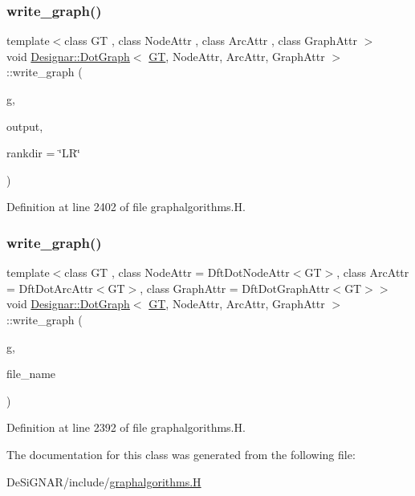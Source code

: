 \subsubsection{\texorpdfstring{write\+\_\+graph()}{write\_graph()}\hspace{0.1cm}{\footnotesize\ttfamily [1/2]}}
{\footnotesize\ttfamily template$<$class GT , class Node\+Attr , class Arc\+Attr , class Graph\+Attr $>$ \\
void \hyperlink{class_designar_1_1_dot_graph}{Designar\+::\+Dot\+Graph}$<$ \hyperlink{demo-buildgraph_8_c_a3001c40d2c31ca87ed96cd7d1334a55e}{GT}, Node\+Attr, Arc\+Attr, Graph\+Attr $>$\+::write\+\_\+graph (\begin{DoxyParamCaption}\item[{const \hyperlink{demo-buildgraph_8_c_a3001c40d2c31ca87ed96cd7d1334a55e}{GT} \&}]{g,  }\item[{std\+::ofstream \&}]{output,  }\item[{const std\+::string \&}]{rankdir = {\ttfamily \char`\"{}LR\char`\"{}} }\end{DoxyParamCaption})}



Definition at line 2402 of file graphalgorithms.\+H.

\mbox{\label{class_designar_1_1_dot_graph_a6f2b98b76d2c970ad875a59388f693cb}} 
\subsubsection{\texorpdfstring{write\+\_\+graph()}{write\_graph()}\hspace{0.1cm}{\footnotesize\ttfamily [2/2]}}
{\footnotesize\ttfamily template$<$class GT , class Node\+Attr  = Dft\+Dot\+Node\+Attr$<$\+G\+T$>$, class Arc\+Attr  = Dft\+Dot\+Arc\+Attr$<$\+G\+T$>$, class Graph\+Attr  = Dft\+Dot\+Graph\+Attr$<$\+G\+T$>$$>$ \\
void \hyperlink{class_designar_1_1_dot_graph}{Designar\+::\+Dot\+Graph}$<$ \hyperlink{demo-buildgraph_8_c_a3001c40d2c31ca87ed96cd7d1334a55e}{GT}, Node\+Attr, Arc\+Attr, Graph\+Attr $>$\+::write\+\_\+graph (\begin{DoxyParamCaption}\item[{const \hyperlink{demo-buildgraph_8_c_a3001c40d2c31ca87ed96cd7d1334a55e}{GT} \&}]{g,  }\item[{const std\+::string \&}]{file\+\_\+name }\end{DoxyParamCaption})\hspace{0.3cm}{\ttfamily [inline]}}



Definition at line 2392 of file graphalgorithms.\+H.



The documentation for this class was generated from the following file\+:\begin{DoxyCompactItemize}
\item 
De\+Si\+G\+N\+A\+R/include/\hyperlink{graphalgorithms_8_h}{graphalgorithms.\+H}\end{DoxyCompactItemize}
